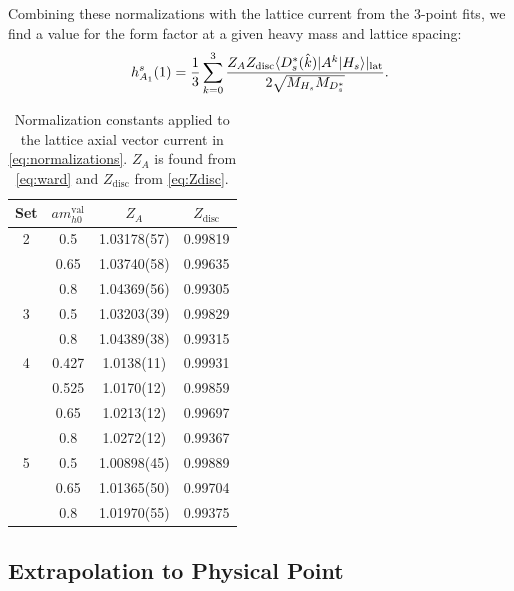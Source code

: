 Combining these normalizations with the lattice current from the 3-point fits, we find a value for the form factor at a given heavy mass and lattice spacing:
\begin{align}
  h_{A_1}^s(1) = {1\over 3} \sum_{k=0}^3 { Z_A Z_{\text{disc}}\langle D_s^*(\hat{k}) | A^k | H_s \rangle |_{\text{lat}}\over 2\sqrt{M_{H_s} M_{D_s^*}} }.
  \label{eq:normalizations}
\end{align}

\begin{table}
  \begin{center}
    \begin{tabular}{ c c c c }
      \hline
      Set & $am^{\text{val}}_{h0}$ & $Z_A$& $Z_{\text{disc}}$\\ [0.5ex]
      \hline
      2 & 0.5 & 1.03178(57) & 0.99819\\ [0.5ex]
      & 0.65 & 1.03740(58) & 0.99635\\ [0.5ex]
      & 0.8 & 1.04369(56) & 0.99305\\ [0.5ex]
      \hline
      3 & 0.5 & 1.03203(39) & 0.99829\\ [0.5ex]
      & 0.8 & 1.04389(38) & 0.99315\\ [0.5ex]
      \hline
      4 & 0.427 & 1.0138(11) & 0.99931\\ [0.5ex]
      & 0.525 & 1.0170(12) & 0.99859\\ [0.5ex]
      & 0.65 & 1.0213(12) & 0.99697\\ [0.5ex]
      & 0.8 & 1.0272(12) & 0.99367\\ [0.5ex]
      \hline
      5 & 0.5 & 1.00898(45) & 0.99889\\ [0.5ex]
      & 0.65 & 1.01365(50) & 0.99704\\ [0.5ex]
      & 0.8 & 1.01970(55) & 0.99375\\ [0.5ex]
      \hline
    \end{tabular}
    \caption{Normalization constants applied to the lattice axial vector current in \eqref{eq:normalizations}. $Z_A$ is found from \eqref{eq:ward} and $Z_{\text{disc}}$ from \eqref{eq:Zdisc}. \label{tab:norms}}
  \end{center}
\end{table}

\subsection{Extrapolation to Physical Point}
\label{sec:BsDsstar_extrapolation}


